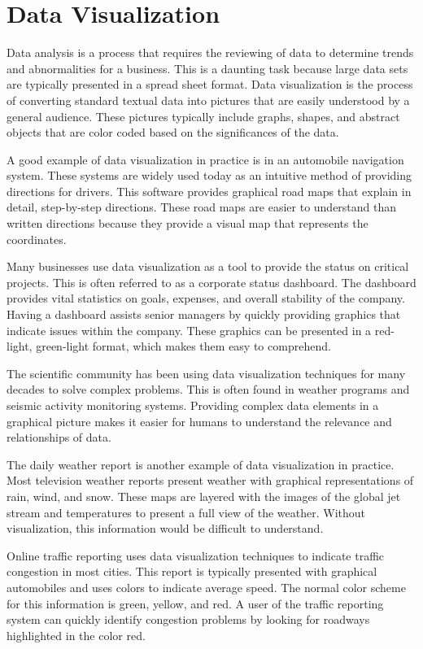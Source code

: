 \section{Data Visualization}
Data analysis is a process that requires the reviewing of data to determine trends and abnormalities for a business. This is a daunting task because large data sets are typically presented in a spread sheet format. Data visualization is the process of converting standard textual data into pictures that are easily understood by a general audience. These pictures typically include graphs, shapes, and abstract objects that are color coded based on the significances of the data.

A good example of data visualization in practice is in an automobile navigation system. These systems are widely used today as an intuitive method of providing directions for drivers. This software provides graphical road maps that explain in detail, step-by-step directions. These road maps are easier to understand than written directions because they provide a visual map that represents the coordinates.

Many businesses use data visualization as a tool to provide the status on critical projects. This is often referred to as a corporate status dashboard. The dashboard provides vital statistics on goals, expenses, and overall stability of the company. Having a dashboard assists senior managers by quickly providing graphics that indicate issues within the company. These graphics can be presented in a red-light, green-light format, which makes them easy to comprehend.

The scientific community has been using data visualization techniques for many decades to solve complex problems. This is often found in weather programs and seismic activity monitoring systems. Providing complex data elements in a graphical picture makes it easier for humans to understand the relevance and relationships of data.

The daily weather report is another example of data visualization in practice. Most television weather reports present weather with graphical representations of rain, wind, and snow. These maps are layered with the images of the global jet stream and temperatures to present a full view of the weather. Without visualization, this information would be difficult to understand.

Online traffic reporting uses data visualization techniques to indicate traffic congestion in most cities. This report is typically presented with graphical automobiles and uses colors to indicate average speed. The normal color scheme for this information is green, yellow, and red. A user of the traffic reporting system can quickly identify congestion problems by looking for roadways highlighted in the color red.

